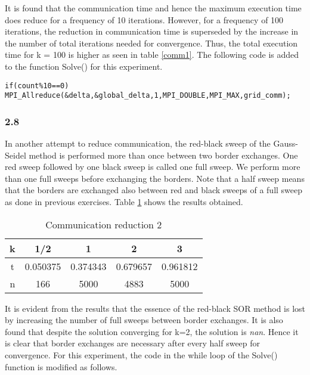 	It is found that the communication time and hence the maximum execution time does reduce for a frequency of 10 iterations. However, for a frequency of 100 iterations, the reduction in communication time is superseded by the increase in the number of total iterations needed for convergence. Thus, the total execution time for k = 100 is higher as seen in table \ref{comm1}. The following code is added to the function Solve() for this experiment. \\
	
\begin{lstlisting}[style=CStyle]
if(count%10==0)
MPI_Allreduce(&delta,&global_delta,1,MPI_DOUBLE,MPI_MAX,grid_comm);
\end{lstlisting}

\subsubsection*{2.8}
In another attempt to reduce communication, the red-black sweep of the Gauss-Seidel method is performed more than once between two border exchanges. One red sweep followed by one black sweep is called one full sweep. We perform more than one full sweeps before exchanging the borders. Note that a half sweep means that the borders are exchanged also between red and black sweeps of a full sweep as done in previous exercises. Table \ref{comm2} shows the results obtained. \\
	
\begin{table}[h!]
  \centering
  \begin{tabular}{|c|c c c c|}
    \hline
    k & 1/2 & 1 		 	& 2 		& 3  \\
    \hline
    t & 0.050375 & 0.374343	& 0.679657  & 0.961812 \\	
    n & 166	   & 5000		& 4883	    & 5000 \\
    \hline	
  \end{tabular}
  \caption{Communication reduction 2}
  \label{comm2}
\end{table}

It is evident from the results that the essence of the red-black SOR method is lost by increasing the number of full sweeps between border exchanges. It is also found that despite the solution converging for k=2, the solution is \textit{nan}. Hence it is clear that border exchanges are necessary after every half sweep for convergence. For this experiment, the code in the while loop of the Solve() function is modified as follows. \\
	
